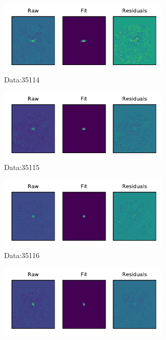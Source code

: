 \begin{figure}
    \centering
    \begin{subfigure}[b]{.5\textwidth}
        \centering
        \includegraphics[height=100pt]{CodeAndFigures/DataFits4.pdf}
        \caption{Data:35114}
        \label{fig:lmtFit4}
    \end{subfigure}
    \begin{subfigure}[b]{.5\textwidth}
        \centering
        \includegraphics[height=100pt]{CodeAndFigures/DataFits5.pdf}
        \caption{Data:35115}
        \label{fig:lmtFit5}
    \end{subfigure}
    \begin{subfigure}[b]{.5\textwidth}
        \centering
        \includegraphics[height=100pt]{CodeAndFigures/DataFits6.pdf}
        \caption{Data:35116}
        \label{fig:lmtFit6}
    \end{subfigure}
    \begin{subfigure}[b]{.5\textwidth}
        \centering
        \includegraphics[height=100pt]{CodeAndFigures/DataFits7.pdf}

\end{subfigure}
\end{figure}
